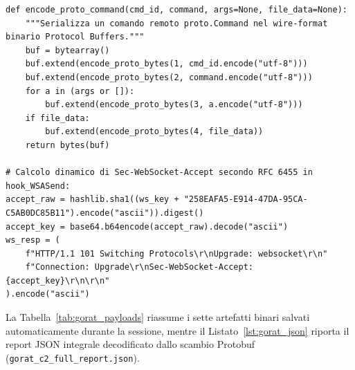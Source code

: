 \documentclass[11pt, a4paper]{article}
\begin{document}
\begin{lstlisting}[style=pythoncode, caption={Handshake WebSocket RFC 6455, demasking dei frame binari e iniezione di comandi Protocol Buffers.}, label={lst:gorat_c2}]
def encode_proto_command(cmd_id, command, args=None, file_data=None):
    """Serializza un comando remoto proto.Command nel wire-format binario Protocol Buffers."""
    buf = bytearray()
    buf.extend(encode_proto_bytes(1, cmd_id.encode("utf-8")))
    buf.extend(encode_proto_bytes(2, command.encode("utf-8")))
    for a in (args or []):
        buf.extend(encode_proto_bytes(3, a.encode("utf-8")))
    if file_data:
        buf.extend(encode_proto_bytes(4, file_data))
    return bytes(buf)

# Calcolo dinamico di Sec-WebSocket-Accept secondo RFC 6455 in hook_WSASend:
accept_raw = hashlib.sha1((ws_key + "258EAFA5-E914-47DA-95CA-C5AB0DC85B11").encode("ascii")).digest()
accept_key = base64.b64encode(accept_raw).decode("ascii")
ws_resp = (
    f"HTTP/1.1 101 Switching Protocols\r\nUpgrade: websocket\r\n"
    f"Connection: Upgrade\r\nSec-WebSocket-Accept: {accept_key}\r\n\r\n"
).encode("ascii")
\end{lstlisting}

La Tabella~\ref{tab:gorat_payloads} riassume i sette artefatti binari salvati automaticamente durante la sessione, mentre il Listato~\ref{lst:gorat_json} riporta il report JSON integrale decodificato dallo scambio Protobuf (\texttt{gorat\_\allowbreak{}c2\_\allowbreak{}full\_\allowbreak{}report.\allowbreak{}json}).
\end{document}
